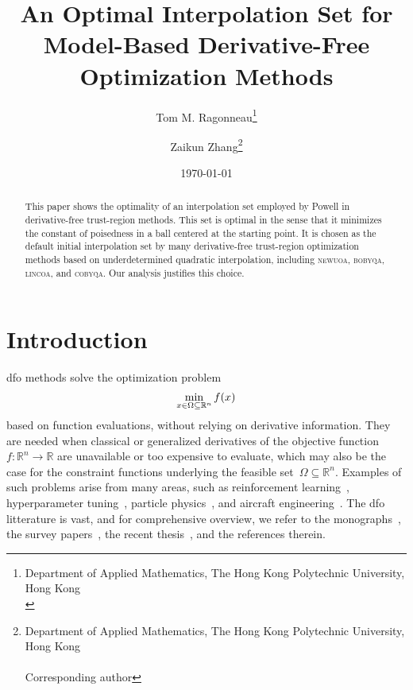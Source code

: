 \documentclass[draft]{article}
\title{An Optimal Interpolation Set for Model-Based Derivative-Free Optimization Methods}
\author{
    Tom M. Ragonneau\thanks{
        Department of Applied Mathematics, The Hong Kong Polytechnic University, Hong Kong\\
        \email{tom.ragonneau@polyu.edu.hk} \quad \website[globe-asia]{www.tomragonneau.com}
    }\orcid{0000-0003-2717-2876} \and
    Zaikun Zhang\thanks{
        Department of Applied Mathematics, The Hong Kong Polytechnic University, Hong Kong\\
        \email{zaikun.zhang@polyu.edu.hk} \quad \website[globe-asia]{www.zhangzk.net}\\
        Corresponding author
    }\orcid{0000-0001-8934-8190}
}
\date{\today}
\numberwithin{equation}{section}
\theoremstyle{definition}
\theoremstyle{plain}
\theoremstyle{remark}
\newcommand*{\fset}{\Omega}
\newcommand*{\obj}{f}
\newcommand*{\R}{\mathbb{R}}
\newcommand*{\solvername}[1]{\textsc{#1}\xspace}
\begin{document}
\maketitle

\begin{abstract}
    This paper shows the optimality of an interpolation set employed by Powell in derivative-free trust-region methods.
    This set is optimal in the sense that it minimizes the constant of poisedness in a ball centered at the starting point.
    It is chosen as the default initial interpolation set by many derivative-free trust-region optimization methods based on underdetermined quadratic interpolation, including \solvername{newuoa}, \solvername{bobyqa}, \solvername{lincoa}, and \solvername{cobyqa}.
    Our analysis justifies this choice.
\end{abstract}



\section{Introduction}

\Gls{dfo} methods solve the optimization problem
\begin{equation}
    \label{eq:nlp}
    \min_{x \in \fset \subseteq \R^n} \obj(x)\\
\end{equation}
based on function evaluations, without relying on derivative information.
They are needed when classical or generalized derivatives of the objective function~$\obj \colon \R^n \to \R$ are unavailable or too expensive to evaluate, which may also be the case for the constraint functions underlying the feasible set~$\fset \subseteq \R^n$.
Examples of such problems arise from many areas, such as reinforcement learning~\cite{Qian_Yu_2021}, hyperparameter tuning~\cite{Ghanbari_Scheinberg_2017}, particle physics~\cite{Eldred_Etal_2022}, and aircraft engineering~\cite{Gazaix_Etal_2019}.
The \gls{dfo} litterature is vast, and for comprehensive overview, we refer to the monographs~\cite{Conn_Scheinberg_Vicente_2009,Audet_Hare_2017}, the survey papers~\cite{Powell_1975,Powell_1998,Rios_Sahinidis_2013,Custodio_Scheinberg_Vicente_2017,Larson_Menickelly_Wild_2019}, the recent thesis~\cite{Ragonneau_2022}, and the references therein.
\end{document}
